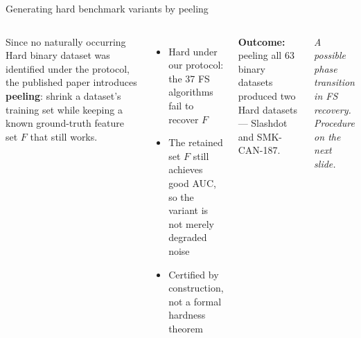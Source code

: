 \documentclass[aspectratio=169,10pt,dvipsnames]{beamer}
\begin{document}
\begin{frame}{Generating hard benchmark variants by peeling}
\begin{columns}[T]
\vspace{0.2cm}
Since no naturally occurring Hard binary dataset was identified under the protocol,
the published paper introduces \textbf{peeling}:  \textcolor{easygreen} {shrink a dataset's training set
while keeping a known ground-truth feature set $F$ that still works.}

\medskip
\begin{itemize}
  \item Hard under our protocol: the 37 FS algorithms fail to recover $F$
  \item The retained set $F$ still achieves good AUC, so the variant is not
        merely degraded noise
  \item Certified by construction, not a formal hardness theorem
\end{itemize}

\pause
\medskip
\textbf{Outcome:} peeling all 63 binary datasets produced two Hard datasets ---
Slashdot and SMK-CAN-187.

\vspace{0.2cm}
\centering
{}

\vspace{2pt}
{\small\textit{A possible phase transition in FS recovery.\\
Procedure on the next slide.}}
\end{columns}
\end{frame}
\end{document}
